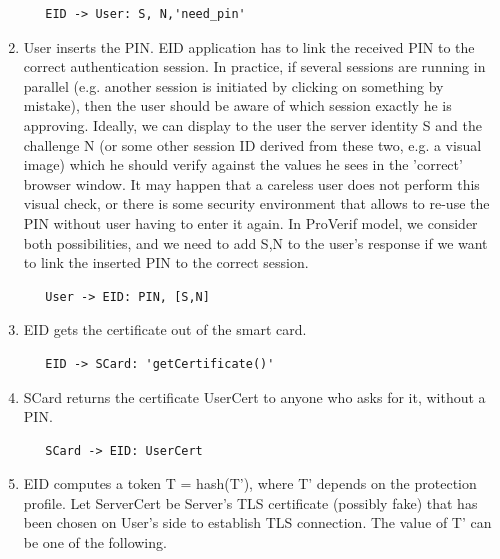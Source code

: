 \begin{enumerate}
\begin{verbatim}
   EID -> User: S, N,'need_pin'
\end{verbatim}
\item\label{item:auth:step6} User inserts the PIN. EID application has to link the received PIN to the correct authentication session. In practice, if several sessions are running in parallel (e.g. another session is initiated by clicking on something by mistake), then the user should be aware of which session exactly he is approving. Ideally, we can display to the user the server identity S and the challenge N (or some other session ID derived from these two, e.g. a visual image) which he should verify against the values he sees in the 'correct' browser window. It may happen that a careless user does not perform this visual check, or there is some security environment that allows to re-use the PIN without user having to enter it again. In ProVerif model, we consider both possibilities, and we need to add S,N to the user's response if we want to link the inserted PIN to the correct session.
\begin{verbatim}
   User -> EID: PIN, [S,N]
\end{verbatim}
\item\label{item:auth:step7} EID gets the certificate out of the smart card.
\begin{verbatim}
   EID -> SCard: 'getCertificate()'
\end{verbatim}
\item\label{item:auth:step8} SCard returns the certificate UserCert to anyone who asks for it, without a PIN.
\begin{verbatim}
   SCard -> EID: UserCert
\end{verbatim}
\item\label{item:auth:step9} EID computes a token T = hash(T'), where T' depends on the protection profile. Let ServerCert be Server's TLS certificate (possibly fake) that has been chosen on User's side to establish TLS connection. The value of T' can be one of the following.


\end{enumerate}
